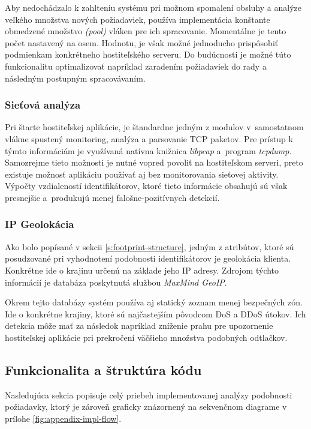 \documentclass[
  printed, %
  table,   %
  lof,     %
  nolot,   %
  nocover
]{fithesis3}
\begin{document}
Aby nedochádzalo k zahlteniu systému pri možnom spomalení obsluhy a analýze veľkého množstva 
nových požiadaviek, používa implementácia konštante obmedzené množstvo \textit{(pool)}
vláken pre ich spracovanie. Momentálne je tento počet nastavený na osem. Hodnotu, je však
možné jednoducho prispôsobiť podmienkam konkrétneho hostiteľského serveru. Do budúcnosti
je možné túto funkcionalitu optimalizovať napríklad zaradením požiadaviek do rady a následným
postupným spracovávaním. 

\subsubsection{\bf{Sieťová analýza}}
Pri štarte hostiteľskej aplikácie, je štandardne jedným z modulov v~samostatnom
vlákne spustený monitoring, analýza a parsovanie TCP paketov. Pre prístup k
týmto informáciám je využívaná natívna knižnica \textit{libpcap} a~program
\textit{tcpdump}. Samozrejme tieto možnosti je nutné vopred povoliť na
hostiteľskom serveri, preto existuje možnosť aplikáciu používať aj bez
monitorovania sieťovej aktivity. Výpočty vzdialeností identifikátorov, ktoré
tieto informácie obsahujú sú však presnejšie a~produkujú menej falošne-pozitívnych detekcií.

\subsubsection{\bf{IP Geolokácia}}
Ako bolo popísané v sekcii \ref{s:footprint-structure}, jedným z atribútov, ktoré sú posudzované pri
vyhodnotení podobnosti identifikátorov je geolokácia klienta. Konkrétne ide o
krajinu určenú na základe jeho IP adresy. Zdrojom týchto
informácií je databáza poskytnutá službou \textit{MaxMind GeoIP}.

Okrem tejto databázy systém používa aj statický zoznam menej bezpečných zón.
Ide o konkrétne krajiny, ktoré sú najčastejším pôvodcom DoS a DDoS útokov. Ich
detekcia môže mať za následok napríklad zníženie prahu pre upozornenie
hostiteľskej aplikácie pri prekročení väčšieho množstva podobných odtlačkov.

\subsection{Funkcionalita a štruktúra kódu}
Nasledujúca sekcia popisuje celý priebeh implementovanej analýzy podobnosti
požiadavky, ktorý je zároveň graficky znázornený na sekvenčnom diagrame v prílohe \ref{fig:appendix-impl-flow}.
\end{document}
